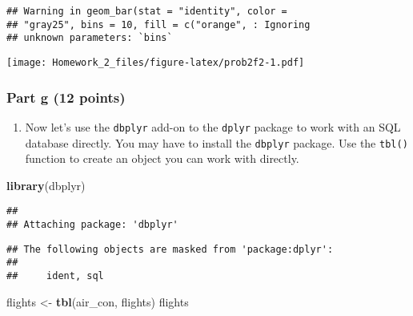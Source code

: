 \documentclass[
]{article}
\newenvironment{Shaded}{\begin{snugshade}}{\end{snugshade}}
\newcommand{\FunctionTok}[1]{\textcolor[rgb]{0.13,0.29,0.53}{\textbf{#1}}}
\newcommand{\NormalTok}[1]{#1}
\newcommand{\OtherTok}[1]{\textcolor[rgb]{0.56,0.35,0.01}{#1}}
\newcommand{\StringTok}[1]{\textcolor[rgb]{0.31,0.60,0.02}{#1}}
\providecommand{\tightlist}{%
  \setlength{\itemsep}{0pt}\setlength{\parskip}{0pt}}
\begin{document}
\begin{verbatim}
## Warning in geom_bar(stat = "identity", color =
## "gray25", bins = 10, fill = c("orange", : Ignoring
## unknown parameters: `bins`
\end{verbatim}

\texttt{[image: Homework\_2\_files/figure-latex/prob2f2-1.pdf]}

\hypertarget{part-g-12-points}{%
\subsubsection{Part g (12 points)}\label{part-g-12-points}}

\begin{enumerate}
\def\labelenumi{\arabic{enumi}.}
\tightlist
\item
  Now let's use the \texttt{dbplyr} add-on to the \texttt{dplyr} package
  to work with an SQL database directly. You may have to install the
  \texttt{dbplyr} package. Use the \texttt{tbl()} function to create an
  object you can work with directly.
\end{enumerate}

\begin{Shaded}
\begin{Highlighting}[]
\FunctionTok{library}\NormalTok{(dbplyr)}
\end{Highlighting}
\end{Shaded}

\begin{verbatim}
## 
## Attaching package: 'dbplyr'
\end{verbatim}

\begin{verbatim}
## The following objects are masked from 'package:dplyr':
## 
##     ident, sql
\end{verbatim}

\begin{Shaded}
\begin{Highlighting}[]
\NormalTok{flights }\OtherTok{\textless{}{-}} \FunctionTok{tbl}\NormalTok{(air\_con, }\StringTok{\textquotesingle{}flights\textquotesingle{}}\NormalTok{) }
\NormalTok{flights}
\end{Highlighting}
\end{Shaded}
\end{document}
